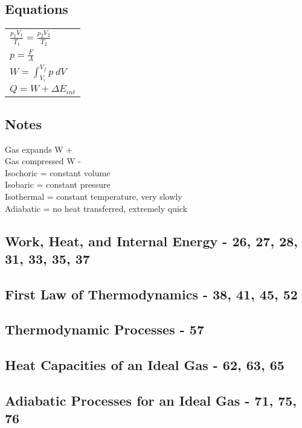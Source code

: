 \documentclass[12pt, letterpaper, twoside]{article}
\begin{document}
  \subsection*{Equations}
    \begin{tabular}{l}
      $\frac{p_1V_1}{T_1} = \frac{p_2V_2}{T_2}$\\
      $p = \frac{F}{A}$\\
      $W = \int_{V_i}^{V_f} p \ dV$\\
      $Q = W + \Delta E_{int}$\\
    \end{tabular}
  
  \subsection*{Notes}
    Gas expands W +\\
    Gas compressed W -\\
    Isochoric = constant volume\\
    Isobaric = constant pressure\\
    Isothermal = constant temperature, very slowly\\
    Adiabatic = no heat transferred, extremely quick\\
    
  
  \setcounter{subsection}{1}
  \subsection{Work, Heat, and Internal Energy - 26, 27, 28, 31, 33, 35, 37}
  
  \subsection{First Law of Thermodynamics - 38, 41, 45, 52}
  
  \subsection{Thermodynamic Processes - 57}
  
  \subsection{Heat Capacities of an Ideal Gas - 62, 63, 65}
  
  \subsection{Adiabatic Processes for an Ideal Gas - 71, 75, 76}
  
\end{document}
